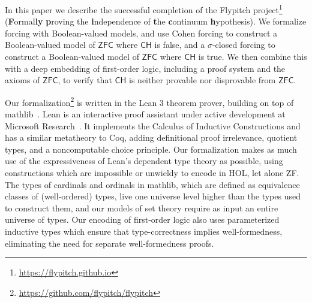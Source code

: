 \documentclass[sigplan,10pt,review, anonymous]{acmart}
\newcommand{\ZFC}{\mathsf{ZFC}}
\newcommand{\CH}{\mathsf{CH}}
\theoremstyle{definition}
\begin{document}
In this paper we describe the successful completion of the Flypitch project\footnote{\url{https://flypitch.github.io}} (\textbf{F}ormal\textbf{ly} \textbf{p}roving the \textbf{i}ndependence of \textbf{t}he \textbf{c}ontinuum \textbf{h}ypothesis).
We formalize forcing with Boolean-valued models, and use Cohen forcing to construct a Boolean-valued model of \(\ZFC\) where \(\CH\) is false, and a \(\sigma\)-closed forcing to construct a Boolean-valued model of \(\ZFC\) where \(\CH\) is true. We then combine this with a deep embedding of first-order logic, including a proof system and the axioms of \(\ZFC\), to verify that \(\CH\) is neither provable nor disprovable from \(\ZFC\).

Our formalization\footnote{\url{https://github.com/flypitch/flypitch}} is written in the Lean 3 theorem prover, building on top of \textsf{mathlib}~\cite{mathlib}. %
Lean is an interactive proof assistant under active development at Microsoft Research~\cite{de2015lean, ullrich2019counting}.
It implements the Calculus of Inductive Constructions and has a similar metatheory to Coq, adding definitional proof irrelevance, quotient types, and a noncomputable choice principle.
Our formalization makes as much use of the expressiveness of Lean's dependent type theory as possible, using constructions which are impossible or unwieldy to encode in HOL, let alone ZF.
The types of cardinals and ordinals in \textsf{mathlib}, which are defined as equivalence classes of (well-ordered) types, live one universe level higher than the types used to construct them, and our models of set theory require as input an entire universe of types. Our encoding of first-order logic also uses parameterized inductive types which ensure that type-correctness implies well-formedness, eliminating the need for separate well-formedness proofs.

\end{document}

